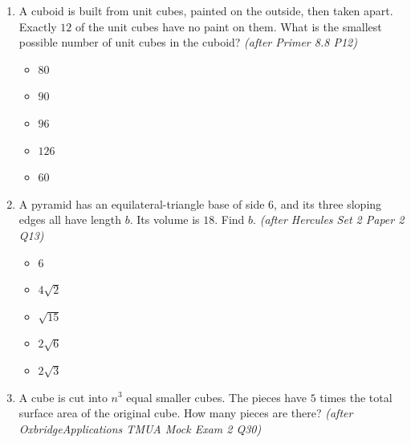 \documentclass[11pt,a4paper]{article}
\begin{document}
\begin{enumerate}
\item A cuboid is built from unit cubes, painted on the outside, then taken apart. Exactly $12$ of the unit cubes have no paint on them. What is the smallest possible number of unit cubes in the cuboid? \textit{\small(after Primer 8.8 P12)}
\begin{itemize}
\item[A)] $80$
\item[B)] $90$
\item[C)] $96$
\item[D)] $126$
\item[E)] $60$
\end{itemize}


\item A pyramid has an equilateral-triangle base of side $6$, and its three sloping edges all have length $b$. Its volume is $18$. Find $b$. \textit{\small(after Hercules Set 2 Paper 2 Q13)}
\begin{itemize}
\item[A)] $6$
\item[B)] $4\sqrt2$
\item[C)] $\sqrt{15}$
\item[D)] $2\sqrt6$
\item[E)] $2\sqrt3$
\end{itemize}


\item A cube is cut into $n^3$ equal smaller cubes. The pieces have $5$ times the total surface area of the original cube. How many pieces are there? \textit{\small(after OxbridgeApplications TMUA Mock Exam 2 Q30)}


\end{enumerate}
\end{document}
